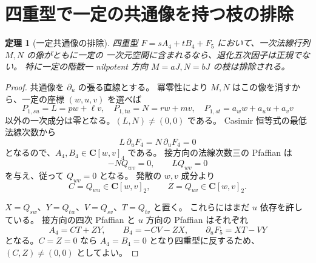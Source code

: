 \documentclass[11pt,a4paper]{ltjsarticle}
\newcommand{\CC}{\mathbf C}\newcommand{\QQ}{\mathbf Q}
\newtheorem{theorem}{定理}[section]
\theoremstyle{remark}\newtheorem{remark}[theorem]{注意}
\begin{document}
\section{四重型で一定の共通像を持つ枝の排除}
\label{sec:v19-m4-fixed-image}

\begin{theorem}[一定共通像の排除]\label{thm:v19-m4-fixed-image}
四重型 $F=sA_4+tB_4+F_5$ において、一次法線行列 $M,N$ の像がともに一定の
一次元空間に含まれるなら、退化五次因子は正規でない。
特に一定の階数一 nilpotent 方向 $M=aJ,N=bJ$ の枝は排除される。
\end{theorem}

\begin{proof}
共通像を $\partial_u$ の張る直線とする。
冪零性により $M,N$ はこの像を消すから、一定の座標 $(w,u,v)$ を選べば
\[
 P_{1,su}=L=pw+\ell v,\quad P_{1,tu}=N=rw+mv,
 \quad P_{1,st}=a_w w+a_u u+a_v v
\]
以外の一次成分は零となる。$(L,N)\ne(0,0)$ である。
Casimir 恒等式の最低法線次数から
\[
 L\,\partial_uF_4=N\,\partial_uF_4=0
\]
となるので、$A_4,B_4\in\CC[w,v]_4$ である。
接方向の法線次数三の Pfaffian は
\[
                  -NQ_{wv}=0,\qquad LQ_{wv}=0
\]
を与え、従って $Q_{wv}=0$ となる。
発散の $w,v$ 成分より
\[
 C=Q_{wu}\in\CC[w,v]_2,\qquad Z=Q_{uv}\in\CC[w,v]_2.
\]

$X=Q_{sw}$、$Y=Q_{tw}$、$V=Q_{sv}$、$T=Q_{tv}$ と置く。
これらにはまだ $u$ 依存を許している。
接方向の四次 Pfaffian と $u$ 方向の Pfaffian はそれぞれ
\begin{equation}\label{eq:v19-m4-fi-pf}
 A_4=CT+ZY,\qquad B_4=-CV-ZX,
 \qquad \partial_uF_5=XT-VY
\end{equation}
となる。$C=Z=0$ なら $A_4=B_4=0$ となり四重型に反するため、
$(C,Z)\ne(0,0)$ としてよい。


\end{proof}
\end{document}
